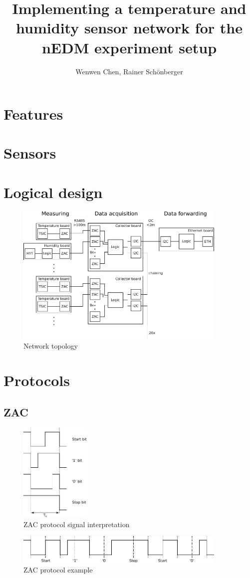 \documentclass[a4paper]{scrreprt}
\title{Implementing a temperature and humidity sensor network for the nEDM
experiment setup}
\author{Wenwen Chen, Rainer Schönberger}
\begin{document}
\maketitle
\tableofcontents

\section{Features}
\section{Sensors}
\section{Logical design}
\begin{figure}
	\centering
	\includegraphics[width=0.9\textwidth]{img/plan2.pdf}
	\caption{Network topology}
	\label{fig:topo}
\end{figure}
\section{Protocols}
\subsection{ZAC}
\begin{figure}
	\centering
	\includegraphics[width=0.3\textwidth]{img/zac_bits.pdf}
	\caption{ZAC protocol signal interpretation}
	\label{fig:zac}
\end{figure}
\begin{figure}
	\centering
	\includegraphics[width=0.9\textwidth]{img/zac_example.pdf}
	\caption{ZAC protocol example}
	\label{fig:zacexample}
\end{figure}
\end{document}
